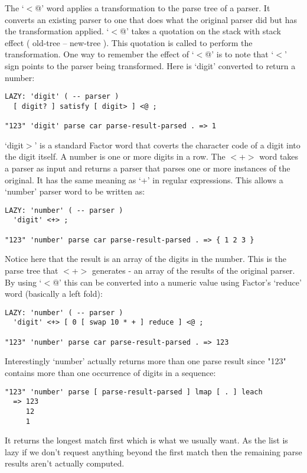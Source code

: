 The `$<$@' word applies a transformation to the parse tree of a
parser. It converts an existing parser to one that does what the
original parser did but has the transformation applied. `$<$@' takes a
quotation on the stack with stack effect ( old-tree -- new-tree
). This quotation is called to perform the transformation. One way to
remember the effect of `$<$@' is to note that `$<$' sign points to the
parser being transformed. Here is `digit' converted to return a
number:

\begin{verbatim}
LAZY: 'digit' ( -- parser )
  [ digit? ] satisfy [ digit> ] <@ ;

"123" 'digit' parse car parse-result-parsed . => 1
\end{verbatim}

`digit$>$' is a standard Factor word that coverts the character code of
a digit into the digit itself. A number is one or more digits in a
row. The $<$+$>$ word takes a parser as input and returns a parser that
parses one or more instances of the original. It has the same meaning
as `+' in regular expressions. This allows a `number' parser word to
be written as:

\begin{verbatim}
LAZY: 'number' ( -- parser )
  'digit' <+> ;

"123" 'number' parse car parse-result-parsed . => { 1 2 3 }
\end{verbatim}

Notice here that the result is an array of the digits in the
number. This is the parse tree that $<$+$>$ generates - an array of the
results of the original parser. By using `$<$@' this can be converted
into a numeric value using Factor's `reduce' word (basically a left
fold):

\begin{verbatim}
LAZY: 'number' ( -- parser )
  'digit' <+> [ 0 [ swap 10 * + ] reduce ] <@ ;

"123" 'number' parse car parse-result-parsed . => 123
\end{verbatim}

Interestingly `number' actually returns more than one parse result
since "123" contains more than one occurrence of digits in a sequence:

\begin{verbatim}
"123" 'number' parse [ parse-result-parsed ] lmap [ . ] leach 
  => 123
     12
     1
\end{verbatim}

It returns the longest match first which is what we usually want. As
the list is lazy if we don't request anything beyond the first match
then the remaining parse results aren't actually computed.

